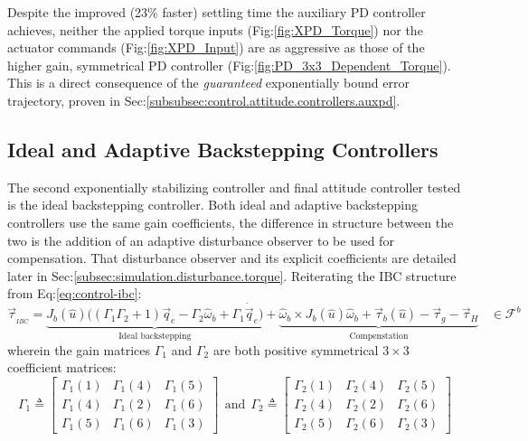 Despite the improved (23\% faster) settling time the auxiliary PD controller achieves, neither the applied torque inputs (Fig:\ref{fig:XPD_Torque}) nor the actuator commands (Fig:\ref{fig:XPD_Input}) are as aggressive as those of the higher gain, symmetrical PD controller (Fig:\ref{fig:PD_3x3_Dependent_Torque}). This is a direct consequence of the \emph{guaranteed} exponentially bound error trajectory, proven in Sec:\ref{subsubsec:control.attitude.controllers.auxpd}.
\subsection{Ideal and Adaptive Backstepping Controllers}
The second exponentially stabilizing controller and final attitude controller tested is the ideal backstepping controller. Both ideal and adaptive backstepping controllers use the same gain coefficients, the difference in structure between the two is the addition of an adaptive disturbance observer to be used for compensation. That disturbance observer and its explicit coefficients are detailed later in Sec:\ref{subsec:simulation.disturbance.torque}. Reiterating the IBC structure from Eq:\ref{eq:control-ibc}:
\begin{equation}\label{eq:simulation-attitude-ibc}
\vec{\tau}_{_{IBC}}=\underbrace{J_b(\hat{u})\Big((\Gamma_1\Gamma_2+1)\vec{q}_e-\Gamma_2\hat{\omega}_b+\Gamma_1\dot{\vec{q}}_e \Big)}_{\text{Ideal backstepping}}
+\underbrace{\hat{\omega}_b\times J_b(\hat{u})\hat{\omega}_b+\vec{\tau}_b(\hat{u})-\vec{\tau}_g-\vec{\tau}_H}_{\text{Compenstation}}~~~~\in\mathcal{F}^{b}
\end{equation}
wherein the gain matrices $\Gamma_1$ and $\Gamma_2$ are both positive symmetrical $3\times 3$ coefficient matrices:
\begin{equation}\label{eq:simulation-attitde-ibc-coefficients}
\Gamma_1\triangleq \begin{bmatrix}
\Gamma_1(1) & \Gamma_1(4) & \Gamma_1(5)\\
\Gamma_1(4) & \Gamma_1(2) & \Gamma_1(6)\\
\Gamma_1(5) & \Gamma_1(6) & \Gamma_1(3)
\end{bmatrix}
~~\text{and}~~
\Gamma_2\triangleq \begin{bmatrix}
\Gamma_2(1) & \Gamma_2(4) & \Gamma_2(5)\\
\Gamma_2(4) & \Gamma_2(2) & \Gamma_2(6)\\
\Gamma_2(5) & \Gamma_2(6) & \Gamma_2(3)
\end{bmatrix}
\end{equation}
